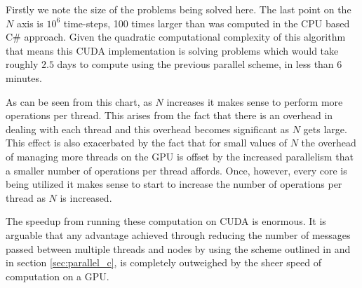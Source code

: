 Firstly we note the size of the problems being solved here. The last point on the $ N $ axis is $10^6$ time-steps, 100 times larger than was computed in the CPU based C\# approach. Given the quadratic computational complexity of this algorithm that means this CUDA implementation is solving problems which would take roughly $ 2.5 $ days to compute using the previous parallel scheme, in less than 6 minutes.

As can be seen from this chart, as $ N $ increases it makes sense to perform more operations per thread. This arises from the fact that there is an overhead in dealing with each thread and this overhead becomes significant as $ N $ gets large. This effect is also exacerbated by the fact that for small values of $ N $ the overhead of managing more threads on the GPU is offset by the increased parallelism that a smaller number of operations per thread affords. Once, however, every core is being utilized it makes sense to start to increase the number of operations per thread as $ N $ is increased.

The speedup from running these computation on CUDA is enormous. It is arguable that any advantage achieved through reducing the number of messages passed between multiple threads and nodes by using the scheme outlined in \cite{Diethelm2011} and in section \ref{sec:parallel_c}, is completely outweighed by the sheer speed of computation on a GPU. 

\clearpage 
